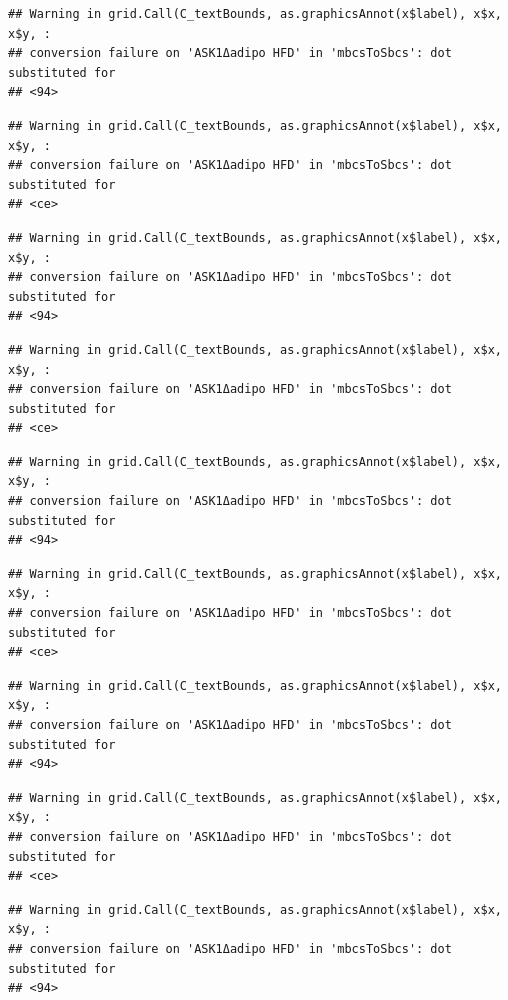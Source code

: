 \documentclass[]{book}
\begin{document}
\begin{verbatim}
## Warning in grid.Call(C_textBounds, as.graphicsAnnot(x$label), x$x, x$y, :
## conversion failure on 'ASK1Δadipo HFD' in 'mbcsToSbcs': dot substituted for
## <94>
\end{verbatim}

\begin{verbatim}
## Warning in grid.Call(C_textBounds, as.graphicsAnnot(x$label), x$x, x$y, :
## conversion failure on 'ASK1Δadipo HFD' in 'mbcsToSbcs': dot substituted for
## <ce>
\end{verbatim}

\begin{verbatim}
## Warning in grid.Call(C_textBounds, as.graphicsAnnot(x$label), x$x, x$y, :
## conversion failure on 'ASK1Δadipo HFD' in 'mbcsToSbcs': dot substituted for
## <94>
\end{verbatim}

\begin{verbatim}
## Warning in grid.Call(C_textBounds, as.graphicsAnnot(x$label), x$x, x$y, :
## conversion failure on 'ASK1Δadipo HFD' in 'mbcsToSbcs': dot substituted for
## <ce>
\end{verbatim}

\begin{verbatim}
## Warning in grid.Call(C_textBounds, as.graphicsAnnot(x$label), x$x, x$y, :
## conversion failure on 'ASK1Δadipo HFD' in 'mbcsToSbcs': dot substituted for
## <94>
\end{verbatim}

\begin{verbatim}
## Warning in grid.Call(C_textBounds, as.graphicsAnnot(x$label), x$x, x$y, :
## conversion failure on 'ASK1Δadipo HFD' in 'mbcsToSbcs': dot substituted for
## <ce>
\end{verbatim}

\begin{verbatim}
## Warning in grid.Call(C_textBounds, as.graphicsAnnot(x$label), x$x, x$y, :
## conversion failure on 'ASK1Δadipo HFD' in 'mbcsToSbcs': dot substituted for
## <94>
\end{verbatim}

\begin{verbatim}
## Warning in grid.Call(C_textBounds, as.graphicsAnnot(x$label), x$x, x$y, :
## conversion failure on 'ASK1Δadipo HFD' in 'mbcsToSbcs': dot substituted for
## <ce>
\end{verbatim}

\begin{verbatim}
## Warning in grid.Call(C_textBounds, as.graphicsAnnot(x$label), x$x, x$y, :
## conversion failure on 'ASK1Δadipo HFD' in 'mbcsToSbcs': dot substituted for
## <94>
\end{verbatim}
\end{document}
